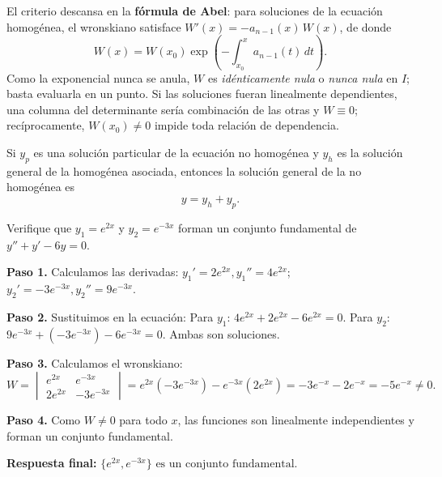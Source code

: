 \begin{rem}
El criterio descansa en la \textbf{fórmula de Abel}: para soluciones de la ecuación homogénea, el wronskiano satisface \(W'(x)=-a_{n-1}(x)\,W(x)\), de donde
\[
W(x)=W(x_0)\exp\!\left(-\int_{x_0}^{x} a_{n-1}(t)\,dt\right).
\]
Como la exponencial nunca se anula, \(W\) es \emph{idénticamente nula} o \emph{nunca nula} en \(I\); basta evaluarla en un punto. Si las soluciones fueran linealmente dependientes, una columna del determinante sería combinación de las otras y \(W\equiv 0\); recíprocamente, \(W(x_0)\neq 0\) impide toda relación de dependencia.
\end{rem}

\begin{theorem}\label{thm:cap28:estructura}
Si $y_p$ es una solución particular de la ecuación no homogénea y $y_h$ es la solución general de la homogénea asociada, entonces la solución general de la no homogénea es
\[
y = y_h + y_p.
\]
\end{theorem}

\begin{example}
Verifique que $y_1 = e^{2x}$ y $y_2 = e^{-3x}$ forman un conjunto fundamental de $y'' + y' - 6y = 0$.

\begin{myproof}
\textbf{Paso 1.} Calculamos las derivadas:
$y_1' = 2e^{2x}, y_1'' = 4e^{2x}$; $y_2' = -3e^{-3x}, y_2'' = 9e^{-3x}$.

\textbf{Paso 2.} Sustituimos en la ecuación:
Para $y_1$: $4e^{2x} + 2e^{2x} - 6e^{2x} = 0$. 
Para $y_2$: $9e^{-3x} + (-3e^{-3x}) - 6e^{-3x} = 0$. Ambas son soluciones.

\textbf{Paso 3.} Calculamos el wronskiano:
\[
W = \begin{vmatrix} e^{2x} & e^{-3x} \\ 2e^{2x} & -3e^{-3x} \end{vmatrix}
= e^{2x}(-3e^{-3x}) - e^{-3x}(2e^{2x}) = -3e^{-x} - 2e^{-x} = -5e^{-x} \neq 0.
\]

\textbf{Paso 4.} Como $W \neq 0$ para todo $x$, las funciones son linealmente independientes y forman un conjunto fundamental.

\textbf{Respuesta final:} $\boxed{\{e^{2x}, e^{-3x}\} \text{ es un conjunto fundamental.}}$
\end{myproof}
\end{example}


